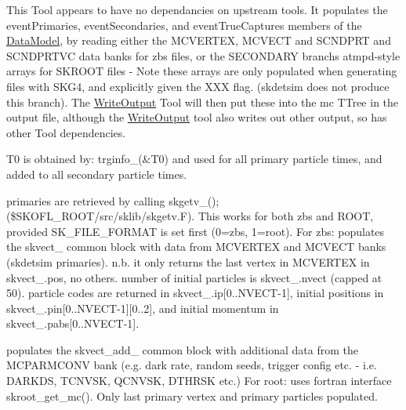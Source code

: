 This Tool appears to have no dependancies on upstream tools. It populates the event\+Primaries, event\+Secondaries, and event\+True\+Captures members of the \mbox{\hyperlink{classDataModel}{Data\+Model}}, by reading either the MCVERTEX, MCVECT and SCNDPRT and SCNDPRTVC data banks for zbs files, or the SECONDARY branch\textquotesingle{}s atmpd-\/style arrays for SKROOT files -\/ Note these arrays are only populated when generating files with SKG4, and explicitly given the XXX flag. (skdetsim does not produce this branch). The \mbox{\hyperlink{classWriteOutput}{Write\+Output}} Tool will then put these into the \textquotesingle{}mc\textquotesingle{} TTree in the output file, although the \mbox{\hyperlink{classWriteOutput}{Write\+Output}} tool also writes out other output, so has other Tool dependencies.

T0 is obtained by\+: {\ttfamily trginfo\+\_\+(\&\+T0)} and used for all primary particle times, and added to all secondary particle times.

primaries are retrieved by calling {\ttfamily skgetv\+\_\+();} (\$\+SKOFL\+\_\+\+ROOT/src/sklib/skgetv.F). This works for both zbs and ROOT, provided \textquotesingle{}SK\+\_\+\+FILE\+\_\+\+FORMAT\textquotesingle{} is set first (0=zbs, 1=root). For zbs\+: populates the {\ttfamily skvect\+\_\+} common block with data from MCVERTEX and MCVECT banks (skdetsim primaries). n.\+b. it only returns the last vertex in MCVERTEX in skvect\+\_\+.\+pos, no others. number of initial particles is skvect\+\_\+.\+nvect (capped at 50). particle codes are returned in skvect\+\_\+.\+ip\mbox{[}0..NVECT-\/1\mbox{]}, initial positions in skvect\+\_\+.\+pin\mbox{[}0..NVECT-\/1\mbox{]}\mbox{[}0..2\mbox{]}, and initial momentum in skvect\+\_\+.\+pabs\mbox{[}0..NVECT-\/1\mbox{]}.

populates the {\ttfamily skvect\+\_\+add\+\_\+} common block with additional data from the MCPARMCONV bank (e.\+g. dark rate, random seeds, trigger config etc. -\/ i.\+e. DARKDS, TCNVSK, QCNVSK, DTHRSK etc.) For root\+: uses fortran interface skroot\+\_\+get\+\_\+mc(). Only last primary vertex and primary particles populated.

